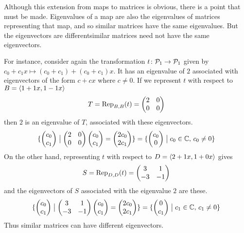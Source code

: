 \begin{remark}
Although this extension from maps to matrices is obvious, 
there is a point that must be made.
Eigenvalues of a map are also the eigenvalues of matrices representing
that map, and so similar matrices have the same eigenvalues.
But the eigenvectors are different\Dash similar matrices need not have the 
same eigenvectors.

For instance, consider again the transformation 
\( \map{t}{\polyspace_1}{\polyspace_1} \) given by
\( c_0+c_1x\mapsto (c_0+c_1)+(c_0+c_1)x \).
It has an eigenvalue of \( 2 \) associated with eigenvectors of the form
\( c+cx \) where \( c\neq 0 \).
If we represent \( t \) with respect to \( B=\sequence{1+1x,1-1x} \)
\begin{equation*}
   T=\rep{t}{B,B}=
   \begin{pmatrix}
      2  &0  \\
      0  &0
   \end{pmatrix}
\end{equation*}
then \( 2 \) is an eigenvalue of \( T \), associated with these eigenvectors.
\begin{equation*}
   \set{\colvec{c_0 \\ c_1}\suchthat \begin{pmatrix}
                                         2  &0  \\
                                         0  &0
                                      \end{pmatrix}\colvec{c_0 \\ c_1}
                                      =\colvec{2c_0 \\ 2c_1}  }
  =\set{\colvec{c_0 \\ 0}\suchthat c_0\in\C,\, c_0\neq 0 }
\end{equation*}
On the other hand, representing $t$ with respect to
\( D=\sequence{2+1x,1+0x} \) gives 
\begin{equation*}
   S=\rep{t}{D,D}=
   \begin{pmatrix}
      3  &1  \\
     -3  &-1
   \end{pmatrix}
\end{equation*}
and the eigenvectors of \( S \) associated with the eigenvalue \( 2 \) are
these.
\begin{equation*}
   \set{\colvec{c_0 \\ c_1}\suchthat \begin{pmatrix}
                                         3  &1  \\
                                        -3  &-1
                                      \end{pmatrix}\colvec{c_0 \\ c_1}
                                      =\colvec{2c_0 \\ 2c_1}  }
  =\set{\colvec{0 \\ c_1}\suchthat c_1\in\C,\, c_1\neq 0 }
\end{equation*}
Thus similar matrices can have different eigenvectors.


\end{remark}
